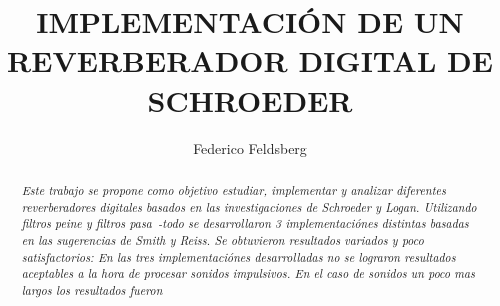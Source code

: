 \documentclass[]{article}
\title{\textbf{\LARGE{\textsf{IMPLEMENTACIÓN DE UN REVERBERADOR DIGITAL DE SCHROEDER}}}}
\date{} %
\begin{document}


\renewcommand{\headrulewidth}{0pt} %


\author[1]{Federico Feldsberg} %


\begin{minipage}[h]{\textwidth} %
    \maketitle
    \thispagestyle{fancy}
    \fancyhf{}
    \rhead{\today}
    \cfoot{\thepage}

\end{minipage}


\begin{abstract}

\textit{Este trabajo se propone como objetivo estudiar, implementar y analizar
diferentes reverberadores digitales basados en las investigaciones de Schroeder y Logan.
Utilizando filtros peine y filtros pasa~-todo se desarrollaron 3 implementaciónes
distintas basadas en las sugerencias de Smith y Reiss. Se obtuvieron resultados variados y poco satisfactorios:
En las tres implementaciónes desarrolladas no se lograron resultados aceptables a la
hora de procesar sonidos impulsivos. En el caso de sonidos un poco mas largos los resultados
fueron
 }
\end{abstract}

\vspace{0.8 cm}%
\end{document}
